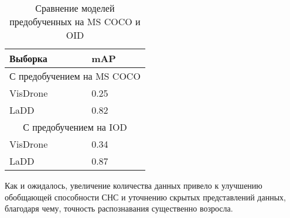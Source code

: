 \begin{table}[H]
    \caption{Сравнение моделей предобученных на MS COCO и OID}\label{leaderboard-2}
    \begin{tabular}{|p{7cm}|p{5cm}|}
        \hline
        {Выборка} & {mAP} \\
        \hline
        \multicolumn{2}{|c|}{С предобучением на MS COCO} \\
        \hline
        VisDrone & 0.25 \\
        \hline
        LaDD & 0.82 \\
        \hline
        \multicolumn{2}{|c|}{С предобучением на IOD} \\
        \hline
        VisDrone & 0.34 \\
        \hline
        LaDD & 0.87 \\
        \hline
    \end{tabular}
\end{table}

Как и ожидалось, увеличение количества данных привело к улучшению обобщающей способности СНС и уточнению скрытых представлений данных, благодаря чему, точность распознавания существенно возросла.